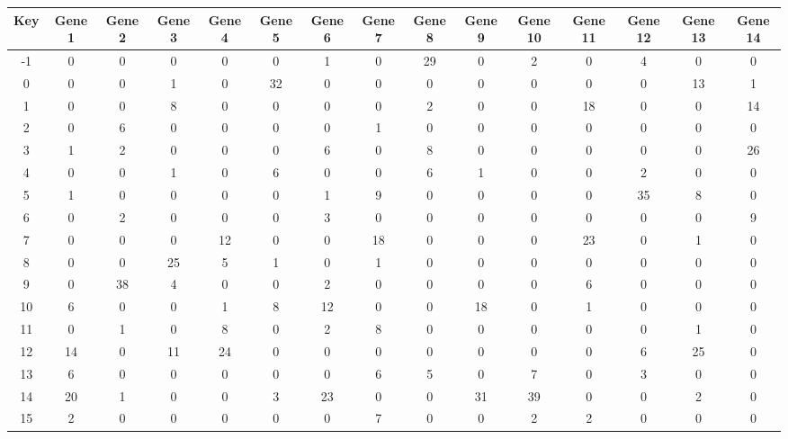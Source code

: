 \begin{tabular}{|c|c|c|c|c|c|c|c|c|c|c|c|c|c|c|}
\hline
Key & Gene 1 & Gene 2 & Gene 3 & Gene 4 & Gene 5 & Gene 6 & Gene 7 & Gene 8 & Gene 9 & Gene 10 & Gene 11 & Gene 12 & Gene 13 & Gene 14 \\
\hline
-1 & 0 & 0 & 0 & 0 & 0 & 1 & 0 & 29 & 0 & 2 & 0 & 4 & 0 & 0 \\
0 & 0 & 0 & 1 & 0 & 32 & 0 & 0 & 0 & 0 & 0 & 0 & 0 & 13 & 1 \\
1 & 0 & 0 & 8 & 0 & 0 & 0 & 0 & 2 & 0 & 0 & 18 & 0 & 0 & 14 \\
2 & 0 & 6 & 0 & 0 & 0 & 0 & 1 & 0 & 0 & 0 & 0 & 0 & 0 & 0 \\
3 & 1 & 2 & 0 & 0 & 0 & 6 & 0 & 8 & 0 & 0 & 0 & 0 & 0 & 26 \\
4 & 0 & 0 & 1 & 0 & 6 & 0 & 0 & 6 & 1 & 0 & 0 & 2 & 0 & 0 \\
5 & 1 & 0 & 0 & 0 & 0 & 1 & 9 & 0 & 0 & 0 & 0 & 35 & 8 & 0 \\
6 & 0 & 2 & 0 & 0 & 0 & 3 & 0 & 0 & 0 & 0 & 0 & 0 & 0 & 9 \\
7 & 0 & 0 & 0 & 12 & 0 & 0 & 18 & 0 & 0 & 0 & 23 & 0 & 1 & 0 \\
8 & 0 & 0 & 25 & 5 & 1 & 0 & 1 & 0 & 0 & 0 & 0 & 0 & 0 & 0 \\
9 & 0 & 38 & 4 & 0 & 0 & 2 & 0 & 0 & 0 & 0 & 6 & 0 & 0 & 0 \\
10 & 6 & 0 & 0 & 1 & 8 & 12 & 0 & 0 & 18 & 0 & 1 & 0 & 0 & 0 \\
11 & 0 & 1 & 0 & 8 & 0 & 2 & 8 & 0 & 0 & 0 & 0 & 0 & 1 & 0 \\
12 & 14 & 0 & 11 & 24 & 0 & 0 & 0 & 0 & 0 & 0 & 0 & 6 & 25 & 0 \\
13 & 6 & 0 & 0 & 0 & 0 & 0 & 6 & 5 & 0 & 7 & 0 & 3 & 0 & 0 \\
14 & 20 & 1 & 0 & 0 & 3 & 23 & 0 & 0 & 31 & 39 & 0 & 0 & 2 & 0 \\
15 & 2 & 0 & 0 & 0 & 0 & 0 & 7 & 0 & 0 & 2 & 2 & 0 & 0 & 0 \\
\hline
\end{tabular}